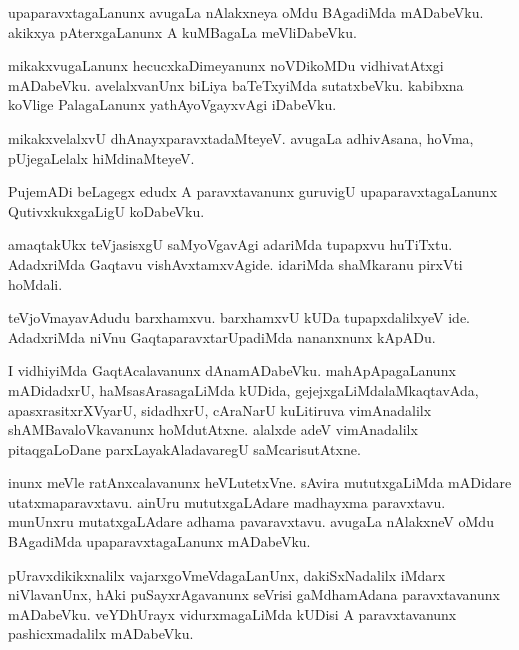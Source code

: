 \documentclass{article}
\begin{document}
\begin{mn}
upaparavxtagaLanunx  avugaLa  nAlakxneya  oMdu  BAgadiMda  mADabeVku.  akikxya  pAterxgaLanunx  
A  kuMBagaLa  meVliDabeVku.
\end{mn}

\begin{mn}
mikakxvugaLanunx  hecucxkaDimeyanunx  noVDikoMDu  vidhivatAtxgi  mADabeVku.  avelalxvanUnx biLiya  
baTeTxyiMda  sutatxbeVku.  kabibxna koVlige  PalagaLanunx  yathAyoVgayxvAgi  iDabeVku.
\end{mn}

\begin{mn}
mikakxvelalxvU  dhAnayxparavxtadaMteyeV.  avugaLa  adhivAsana,  hoVma,  pUjegaLelalx  hiMdinaMteyeV.
\end{mn}

\begin{mn}
PujemADi  beLagegx  edudx  A paravxtavanunx  guruvigU  upaparavxtagaLanunx  QutivxkukxgaLigU  koDabeVku.
\end{mn}

\begin{mn}
amaqtakUkx  teVjasisxgU  saMyoVgavAgi  adariMda  tupapxvu  huTiTxtu.  AdadxriMda  Gaqtavu  
vishAvxtamxvAgide.  idariMda  shaMkaranu  pirxVti  hoMdali.
\end{mn}

\begin{mn}
teVjoVmayavAdudu  barxhamxvu.  barxhamxvU  kUDa  tupapxdalilxyeV  ide.  AdadxriMda  niVnu  
GaqtaparavxtarUpadiMda  nananxnunx  kApADu.
\end{mn}

\begin{mn}
I  vidhiyiMda  GaqtAcalavanunx  dAnamADabeVku.  mahApApagaLanunx  mADidadxrU,  
haMsasArasagaLiMda  kUDida,  gejejxgaLiMdalaMkaqtavAda,  apasxrasitxrXVyarU,  
sidadhxrU,  cAraNarU  kuLitiruva  vimAnadalilx  shAMBavaloVkavanunx  hoMdutAtxne.  
alalxde  adeV  vimAnadalilx  pitaqgaLoDane  parxLayakAladavaregU  saMcarisutAtxne.
\end{mn}

\begin{mn}
inunx  meVle  ratAnxcalavanunx  heVLutetxVne.  sAvira  mututxgaLiMda  mADidare  utatxmaparavxtavu. 
ainUru  mututxgaLAdare  madhayxma  paravxtavu.  munUnxru  mutatxgaLAdare  adhama pavaravxtavu.  
avugaLa  nAlakxneV  oMdu  BAgadiMda  upaparavxtagaLanunx  mADabeVku.
\end{mn}

\begin{mn}
pUravxdikikxnalilx  vajarxgoVmeVdagaLanUnx,  dakiSxNadalilx  iMdarx  niVlavanUnx,  hAki  
puSayxrAgavanunx  seVrisi  gaMdhamAdana  paravxtavanunx  mADabeVku.  veYDhUrayx  
vidurxmagaLiMda  kUDisi  A  paravxtavanunx  pashicxmadalilx  mADabeVku.
\end{mn}
\end{document}
